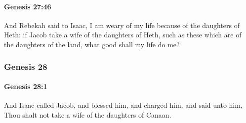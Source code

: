 		\paragraph{Genesis 27:46} %
			\label{GENESIS-27-46}

			And Rebekah said to Isaac, I am weary of my life because of the daughters of Heth: if Jacob take a wife of the daughters of Heth, such as these which are of the daughters of the land, what good shall my life do me?

	\subsubsection{Genesis 28} %
		\label{GENESIS-28}

		\paragraph{Genesis 28:1} %
			\label{GENESIS-28-1}

			And Isaac called Jacob, and blessed him, and charged him, and said unto him, Thou shalt not take a wife of the daughters of Canaan.


